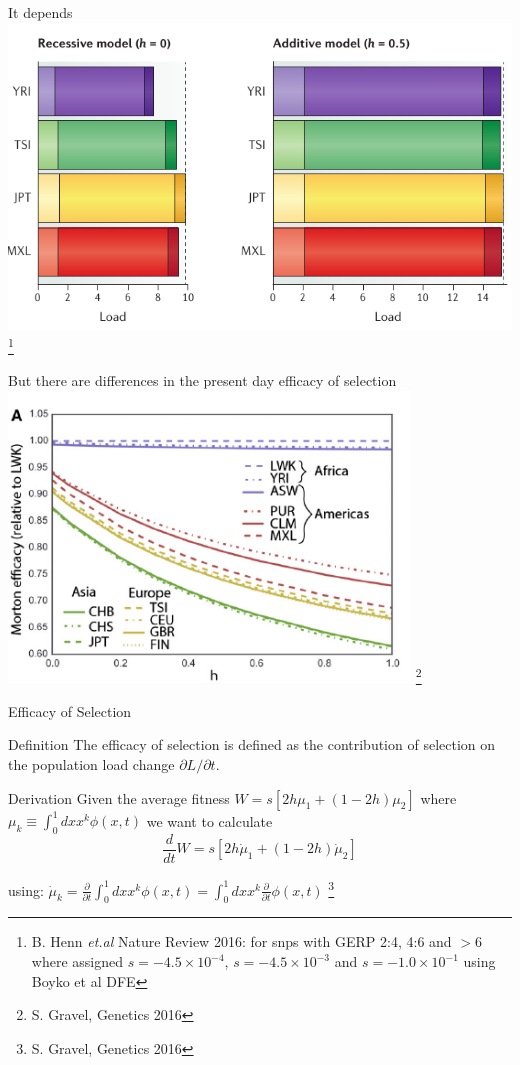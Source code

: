 \documentclass[10pt]{beamer}
\newcommand{\del}[1]{\ensuremath{\frac{\partial}{\partial #1}}}
\begin{document}
\begin{frame}{It depends}
  \vfill
  \includegraphics[width=\textwidth]{./Figures/Henn_NR_load.pdf}
  \let\thefootnote\relax\footnote{B. Henn \textit{et.al} Nature Review 2016: 
    for snps with GERP 2:4, 4:6 and  $>$6 where assigned $s = -4.5 \times
    10^{-4}$,  $s = -4.5 \times 10^{-3}$ and  $s = -1.0 \times 10^{-1}$ using
    Boyko et al DFE}
\end{frame}

\begin{frame}{\normalsize But there are differences in the present day efficacy
    of selection} 
  \vfill
  \centering
  \includegraphics[width=0.8\textwidth]{./Figures/Gravel_efsel.png}
  \let\thefootnote\relax\footnote{S. Gravel, Genetics 2016}
\end{frame}

\begin{frame}{Efficacy of Selection}
  \begin{alertblock}{Definition}
    The efficacy of selection is defined as the contribution of selection on
    the population load change $\partial L / \partial t$.  
  \end{alertblock}
  \begin{block}{Derivation}
    Given the average fitness $W = s[2h\mu_1 + (1 - 2h)\mu_2]$ where
    $\mu_k \equiv \int_0^1 dx x^k \phi(x, t)$ we want to calculate 
    \[
      \frac{d}{dt} W= s[2h \dot \mu_1 + (1 - 2h) \dot \mu_2]
    \]
  \end{block}
  using: 
  $\dot \mu_k = \del t \int_0^1 dx x^k \phi(x, t) = \int_0^1 dx x^k \del t \phi(x, t)$
  \let\thefootnote\relax\footnote{S. Gravel, Genetics 2016}
\end{frame}
\end{document}
